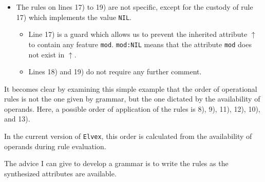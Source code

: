 \documentclass[11pt]{article}
\begin{document}
\begin{itemize}
\begin{itemize}
		      \item Line 11) assigns to the inherited attribute of the noun all
		            values passed by inheritance (\verb#$Rest#) and adds the feature
		            \verb#mod# with the value
		            \verb#$Tail#, which is the tail of the list that brings together
		            all other modifiers of the noun (other adjective or a proposal for
		            example).

		      \item Line 12) allows you to assign the variable
		            \verb#$synthGd# which is the gender synthesized from the noun.

		      \item Finally line 13) assigns to the synthesized attribute of the
		            phrase the synthesized attribute of the noun and adds a feature
		            \texttt{qual} which marks that this noun phrase is qualified
		            (which makes it possible to restrict others modifications).

	      \end{itemize}

	\item The rules on lines 17) to 19) are not specific, except for the
	      custody of rule 17) which implements the value \verb#NIL#.

	      \begin{itemize}
		      \item Line 17) is a guard which allows us to prevent the inherited
		            attribute $\uparrow$ to contain any feature
		            \texttt{mod}. \verb#mod:NIL# means that the attribute \verb#mod#
		            does not exist in $\uparrow$.

		      \item Lines 18) and 19) do not require any further comment.

	      \end{itemize}
\end{itemize}

It becomes clear by examining this simple example that the order of
operational rules is not the one given by grammar, but the one
dictated by the availability of operands. Here, a possible order of
application of the rules is 8), 9), 11), 12), 10), and 13).

In the current version of \texttt{Elvex}, this order is calculated from
the availability of operands during rule evaluation.

The advice I can give to develop a grammar is
to write the rules as the synthesized attributes are available.
\end{document}
